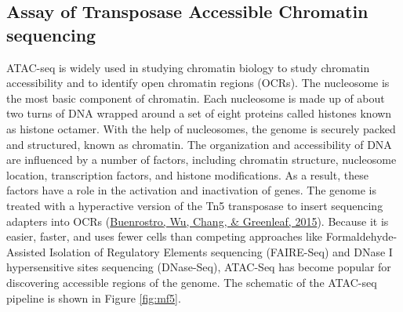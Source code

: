 \documentclass[12pt,twoside]{reedthesis}
\begin{document}
\hypertarget{m3.3}{%
\subsection*{Assay of Transposase Accessible Chromatin sequencing}\label{m3.3}}

ATAC-seq is widely used in studying chromatin biology to study chromatin
accessibility and to identify open chromatin regions (OCRs). The
nucleosome is the most basic component of chromatin. Each nucleosome is
made up of about two turns of DNA wrapped around a set of eight proteins
called histones known as histone octamer. With the help of nucleosomes,
the genome is securely packed and structured, known as chromatin. The
organization and accessibility of DNA are influenced by a number of
factors, including chromatin structure, nucleosome location,
transcription factors, and histone modifications. As a result, these
factors have a role in the activation and inactivation of genes. The
genome is treated with a hyperactive version of the Tn5 transposase to
insert sequencing adapters into OCRs (\protect\hyperlink{ref-buenrostro2015}{Buenrostro, Wu, Chang, \& Greenleaf, 2015}). Because it is
easier, faster, and uses fewer cells than competing approaches like
Formaldehyde-Assisted Isolation of Regulatory Elements sequencing (FAIRE-Seq) and DNase I hypersensitive sites sequencing (DNase-Seq), ATAC-Seq has become popular for discovering
accessible regions of the genome. The schematic of the ATAC-seq pipeline
is shown in Figure \ref{fig:mf5}.
\end{document}
